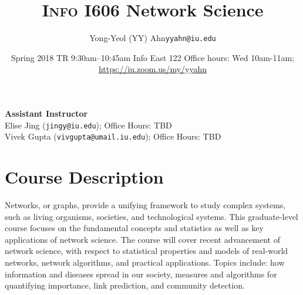 \documentclass[11pt,article,oneside]{memoir} %
\makeatletter
\def\myauthor{Author}
\def\mytitle{Title}
\def\myemail{yyahn@iu.edu}
\def\myauthor{Yong-Yeol (YY) Ahn}
\def\mytitle{{\normalsize \textsc{Info} I606 \newline} \HUGE Network Science}
\makeatother
\begin{document}


\def\ind{\hangindent=1 true cm\hangafter=1 \noindent}
\def\labelitemi{$\cdot$}


\title{\LARGE \mytitle}     
\author{\Large\myauthor \newline \footnotesize\texttt{\noindent\myemail}}
\date{Spring 2018 %
\newline TR 9:30am--10:45am 
\newline Info East 122
\newline Office hours: Wed 10am-11am; \url{https://iu.zoom.us/my/yyahn}}

\maketitle
\vspace{-20pt}
{\bfseries Assistant Instructor} \\ Elise Jing (\texttt{jingy@iu.edu}); Office Hours: TBD \\ Vivek Gupta (\texttt{vivgupta@umail.iu.edu}); Office Hours: TBD 

\section{Course Description} %

Networks, or graphs, provide a unifying framework to study complex systems,
such as living organisms, societies, and technological systems. This
graduate-level course focuses on the fundamental concepts and statistics as
well as key applications of network science. The course will cover recent
advancement of network science, with respect to statistical properties and
models of real-world networks, network algorithms, and practical applications.
Topics include: how information and diseases spread in our society, measures
and algorithms for quantifying importance, link prediction, and community
detection. 

\end{document}

